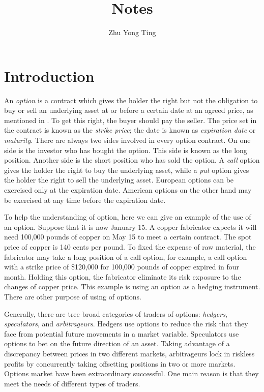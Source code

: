 \documentclass[12pt,oneside,titlepage]{book}
\title{Notes}
\author{Zhu Yong Ting}
\begin{document}
 

\maketitle


\indent \tableofcontents \indent \listoftables \indent
\listoffigures


\chapter{Introduction}


An {\it option} is a contract which gives the holder the right but not the obligation to buy or sell an underlying asset at or before a certain date at an agreed price, as mentioned in \citeauthor{Hull2008}.
To get this right, the buyer should pay the seller. The price set in the contract is known as the {\it strike price}; the date is known as {\it expiration date} or {\it maturity}. There are always two sides involved in every option contract. On one side is the investor who has bought the option. This side is known as the long position. Another side is the short position who has sold the option. A {\it call} option gives the holder the right to buy the underlying asset, while a {\it put} option gives the holder the right to sell the underlying asset. European options can be exercised only at the expiration date. American options on the other hand may be exercised at any time before the expiration date.

To help the understanding of option, here we can give an example of the use of an option. Suppose that it is now January 15. A copper fabricator expects it will need 100,000 pounds of copper on May 15 to meet a certain contract. The spot price of copper is 140 cents per pound. To fixed the expense of raw material, the fabricator may take a long position of a call option, for example, a call option with a strike price of \$120,000 for 100,000 pounds of copper expired in four month. Holding this option, the fabricator eliminate its risk exposure to the changes of copper price. This example is using an option as a hedging instrument. There are other purpose of using of options.

Generally, there are tree broad categories of traders of options: {\it hedgers}, {\it speculators}, and {\it arbitrageurs}. Hedgers use options to reduce the risk that they face from potential future movements in a market variable. Speculators use options to bet on the future direction of an asset. Taking advantage of a discrepancy between prices in two different markets, arbitrageurs lock in riskless profits by concurrently taking offsetting positions in two or more markets. Options market have been extraordinary successful. One main reason is that they meet the needs of different types of traders.
\end{document}
